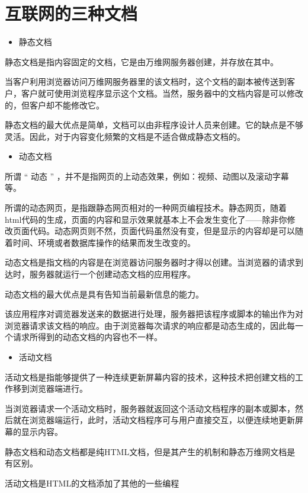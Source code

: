 \section{互联网的三种文档}

\begin{itemize}
    \item[1.] 静态文档
\end{itemize}

静态文档是指内容固定的文档，它是由万维网服务器创建，并存放在其中。

当客户利用浏览器访问万维网服务器里的该文档时，这个文档的副本被传送到客户，客户就可使用浏览程序显示这个文档。当然，服务器中的文档内容是可以修改的，但客户却不能修改它。

静态文档的最大优点是简单，文档可以由非程序设计人员来创建。它的缺点是不够灵活。因此，对于内容变化频繁的文档是不适合做成静态文档的。

\begin{itemize}
    \item[2.] 动态文档
\end{itemize}

所谓 “ 动态 ” ，并不是指网页的上动态效果，例如：视频、动图以及滚动字幕等。

所谓的动态网页，是指跟静态网页相对的一种网页编程技术。静态网页，随着html代码的生成，页面的内容和显示效果就基本上不会发生变化了——除非你修改页面代码。动态网页则不然，页面代码虽然没有变，但是显示的内容却是可以随着时间、环境或者数据库操作的结果而发生改变的。

动态文档是指文档的内容是在浏览器访问服务器时才得以创建。当浏览器的请求到达时，服务器就运行一个创建动态文档的应用程序。

动态文档的最大优点是具有告知当前最新信息的能力。

该应用程序对调览器发送来的数据进行处理，服务器把该程序或脚本的输出作为对浏览器请求该文档的响应。由于浏览器每次请求的响应都是动态生成的，因此每一个请求所得到的动态文档的内容也不一样。

\begin{itemize}
    \item[3.] 活动文档
\end{itemize}

活动文档是指能够提供了一种连续更新屏幕内容的技术，这种技术把创建文档的工作移到浏览器端进行。

当浏览器请求一个活动文档时，服务器就返回这个活动文档程序的副本或脚本，然后就在浏览器端运行，此时，活动文档程序可与用户直接交互，以便连续地更新屏幕的显示内容。

\begin{framed}
    静态文档和动态文档都是纯HTML文档，但是其产生的机制和静态万维网文档是有区别。
    
    活动文档是HTML的文档添加了其他的一些编程
\end{framed}


